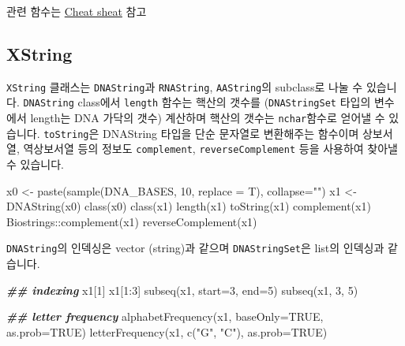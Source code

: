 \documentclass[
]{book}
\newenvironment{Shaded}{\begin{snugshade}}{\end{snugshade}}
\newcommand{\AttributeTok}[1]{\textcolor[rgb]{0.77,0.63,0.00}{#1}}
\newcommand{\ConstantTok}[1]{\textcolor[rgb]{0.00,0.00,0.00}{#1}}
\newcommand{\DecValTok}[1]{\textcolor[rgb]{0.00,0.00,0.81}{#1}}
\newcommand{\DocumentationTok}[1]{\textcolor[rgb]{0.56,0.35,0.01}{\textbf{\textit{#1}}}}
\newcommand{\FunctionTok}[1]{\textcolor[rgb]{0.00,0.00,0.00}{#1}}
\newcommand{\NormalTok}[1]{#1}
\newcommand{\OtherTok}[1]{\textcolor[rgb]{0.56,0.35,0.01}{#1}}
\newcommand{\SpecialCharTok}[1]{\textcolor[rgb]{0.00,0.00,0.00}{#1}}
\newcommand{\StringTok}[1]{\textcolor[rgb]{0.31,0.60,0.02}{#1}}
\begin{document}
관련 함수는 \href{http://bioconductor.org/packages/release/bioc/vignettes/Biostrings/inst/doc/BiostringsQuickOverview.pdf}{Cheat sheat} 참고

\hypertarget{xstring}{%
\subsection{XString}\label{xstring}}

\texttt{XString} 클래스는 \texttt{DNAString}과 \texttt{RNAString}, \texttt{AAString}의 subclass로 나눌 수 있습니다. \texttt{DNAString} class에서 \texttt{length} 함수는 핵산의 갯수를 (\texttt{DNAStringSet} 타입의 변수에서 length는 DNA 가닥의 갯수) 계산하며 핵산의 갯수는 \texttt{nchar}함수로 얻어낼 수 있습니다. \texttt{toString}은 DNAString 타입을 단순 문자열로 변환해주는 함수이며 상보서열, 역상보서열 등의 정보도 \texttt{complement}, \texttt{reverseComplement} 등을 사용하여 찾아낼 수 있습니다.

\begin{Shaded}
\begin{Highlighting}[]
\NormalTok{x0 }\OtherTok{\textless{}{-}} \FunctionTok{paste}\NormalTok{(}\FunctionTok{sample}\NormalTok{(DNA\_BASES, }\DecValTok{10}\NormalTok{, }\AttributeTok{replace =}\NormalTok{ T), }\AttributeTok{collapse=}\StringTok{""}\NormalTok{)}
\NormalTok{x1 }\OtherTok{\textless{}{-}} \FunctionTok{DNAString}\NormalTok{(x0)}
\FunctionTok{class}\NormalTok{(x0)}
\FunctionTok{class}\NormalTok{(x1)}
\FunctionTok{length}\NormalTok{(x1)}
\FunctionTok{toString}\NormalTok{(x1)}
\FunctionTok{complement}\NormalTok{(x1)}
\NormalTok{Biostrings}\SpecialCharTok{::}\FunctionTok{complement}\NormalTok{(x1)}
\FunctionTok{reverseComplement}\NormalTok{(x1)}
\end{Highlighting}
\end{Shaded}

\texttt{DNAString}의 인덱싱은 vector (string)과 같으며 \texttt{DNAStringSet}은 list의 인덱싱과 같습니다.

\begin{Shaded}
\begin{Highlighting}[]
\DocumentationTok{\#\# indexing}
\NormalTok{x1[}\DecValTok{1}\NormalTok{]}
\NormalTok{x1[}\DecValTok{1}\SpecialCharTok{:}\DecValTok{3}\NormalTok{]}
\FunctionTok{subseq}\NormalTok{(x1, }\AttributeTok{start=}\DecValTok{3}\NormalTok{, }\AttributeTok{end=}\DecValTok{5}\NormalTok{)}
\FunctionTok{subseq}\NormalTok{(x1, }\DecValTok{3}\NormalTok{, }\DecValTok{5}\NormalTok{)}

\DocumentationTok{\#\# letter frequency}
\FunctionTok{alphabetFrequency}\NormalTok{(x1, }\AttributeTok{baseOnly=}\ConstantTok{TRUE}\NormalTok{, }\AttributeTok{as.prob=}\ConstantTok{TRUE}\NormalTok{)}
\FunctionTok{letterFrequency}\NormalTok{(x1, }\FunctionTok{c}\NormalTok{(}\StringTok{"G"}\NormalTok{, }\StringTok{"C"}\NormalTok{), }\AttributeTok{as.prob=}\ConstantTok{TRUE}\NormalTok{)}
\end{Highlighting}
\end{Shaded}
\end{document}
